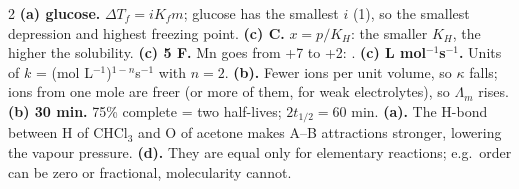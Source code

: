 \documentclass[10pt,a4paper]{extarticle}
\begin{document}
\answerstart
\begin{multicols}{2}\raggedcolumns
{}
\An \textbf{(a) glucose.} $\Delta T_f=iK_fm$; glucose has the smallest $i$ (1), so the smallest depression and highest freezing point.
\An \textbf{(c) C.} $x=p/K_H$: the smaller $K_H$, the higher the solubility.
\An \textbf{(c) 5 F.} Mn goes from +7 to +2: .
\An \textbf{(c) L mol$^{-1}$s$^{-1}$.} Units of $k$ = (mol L$^{-1}$)$^{1-n}$s$^{-1}$ with $n=2$.
\An \textbf{(b).} Fewer ions per unit volume, so $\kappa$ falls; ions from one mole are freer (or more of them, for weak electrolytes), so $\Lambda_m$ rises.
\An \textbf{(b) 30 min.} 75\% complete = two half-lives; $2t_{1/2}=60$ min.
\An \textbf{(a).} The H-bond between H of CHCl$_3$ and O of acetone makes A--B attractions stronger, lowering the vapour pressure.
\An \textbf{(d).} They are equal only for elementary reactions; e.g.\ order can be zero or fractional, molecularity cannot.


\end{multicols}
\end{document}
